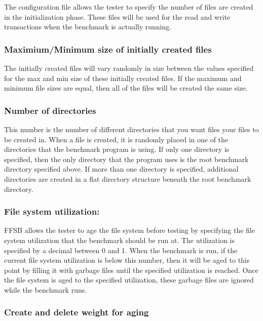 \documentclass[twocolumn]{article}
\begin{document}
The configuration file allows the tester to specify the number of
files are created in the initialization phase.  These files will be
used for the read and write transactions when the benchmark is
actually running.

\subsubsection{Maximium/Minimum size of initially created files}

The initially created files will vary randomly in size between the
values specified for the max and min size of these initially created
files.  If the maximum and minimum file sizes are equal, then all of
the files will be created the same size.

\subsubsection{Number of directories}

This number is the number of different directories that you want files
your files to be created in.  When a file is created, it is randomly
placed in one of the directories that the benchmark program is using.
If only one directory is specified, then the only directory that the
program uses is the root benchmark directory specified above.  If more
than one directory is specified, additional directories are created in
a flat directory structure beneath the root benchmark directory.

\subsubsection{File system utilization:}

FFSB allows the tester to age the file system before testing by
specifying the file system utilization that the benchmark should be
run at.  The utilization is specified by a decimal between 0 and 1.
When the benchmark is run, if the current file system utilization is
below this number, then it will be aged to this point by filling it with
garbage files until the specified utilization is reached.  Once the
file system is aged to the specified utilization, these garbage files
are ignored while the benchmark runs.

\subsubsection{Create and delete weight for aging}
\end{document}
